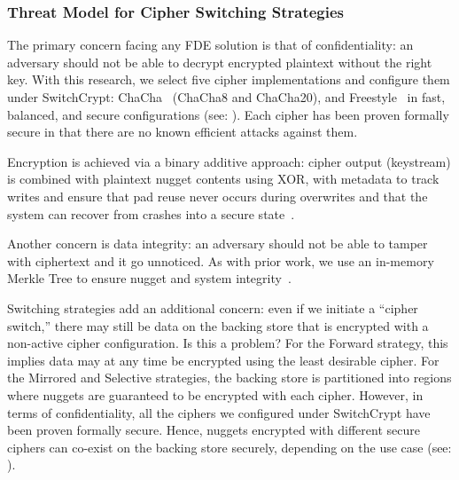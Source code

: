 
\subsubsection{Threat Model for Cipher Switching Strategies}

The primary concern facing any FDE solution is that of confidentiality: an
adversary should not be able to decrypt encrypted plaintext without the right
key. With this research, we select five cipher implementations and configure
them under SwitchCrypt: ChaCha~\cite{ChaCha20} (ChaCha8 and ChaCha20), and
Freestyle~\cite{Freestyle} in fast, balanced, and secure configurations (see:
). Each cipher has been proven formally secure in that
there are no known efficient attacks against them.

Encryption is achieved via a binary additive approach: cipher output (keystream)
is combined with plaintext nugget contents using XOR, with metadata to track
writes and ensure that pad reuse never occurs during overwrites and that the
system can recover from crashes into a secure state~\cite{StrongBox}.

Another concern is data integrity: an adversary should not be able to tamper
with ciphertext and it go unnoticed. As with prior work, we use an in-memory
Merkle Tree to ensure nugget and system integrity~\cite{StrongBox}.

Switching strategies add an additional concern: even if we initiate a ``cipher
switch,'' there may still be data on the backing store that is encrypted with a
non-active cipher configuration. Is this a problem? For the Forward strategy,
this implies data may at any time be encrypted using the least desirable cipher.
For the Mirrored and Selective strategies, the backing store is partitioned into
regions where nuggets are guaranteed to be encrypted with each cipher. However,
in terms of confidentiality, all the ciphers we configured under SwitchCrypt
have been proven formally secure. Hence, nuggets encrypted with different secure
ciphers can co-exist on the backing store securely, depending on the use case
(see: ).

